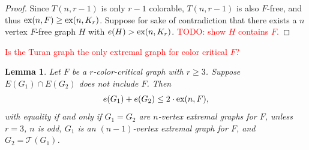 \documentclass[a4paper]{article}
\newtheorem{lemma}[theorem]{Lemma}
\begin{document}
\begin{proof}
  Since $T(n, r - 1)$ is only $r - 1$ colorable, $T(n, r - 1)$ is also $F$-free, and thus
  $\textnormal{ex}(n, F) \geq \textnormal{ex}(n, K_{r})$. Suppose for sake of contradiction that
  there exists a $n$ vertex $F$-free graph $H$ with $e(H) > \textnormal{ex}(n, K_{r})$. 
  \textcolor{red}{TODO: show $H$ contains $F$.}
\end{proof}

\textcolor{red}{Is the Turan graph the only extremal graph for color critical $F$?}

\begin{lemma}
  Let $F$ be a $r$-color-critical graph with $r \geq 3$. Suppose $E(G_1) \cap E(G_2)$ does not
  include $F$. Then
  \[
    e(G_1) + e(G_2) \leq 2 \cdot \textnormal{ex}(n, F),
  \]
  with equality if and only if $G_1 = G_2$ are $n$-vertex extremal graphs for $F$, unless $r = 3$,
  $n$ is odd, $G_1$ is an $(n - 1)$-vertex extremal graph for $F$, and $G_2 = \mathcal{T}(G_1)$. 
\end{lemma}
\end{document}
